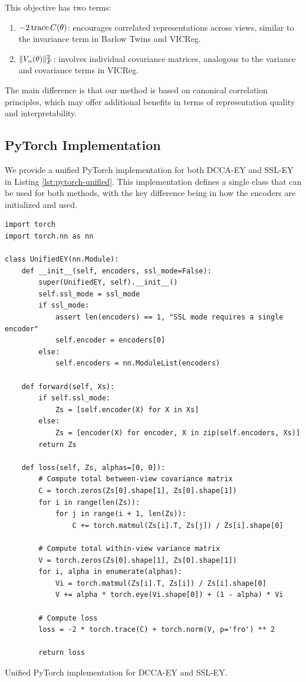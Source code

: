 This objective has two terms:
\begin{enumerate}
    \item $- 2 \operatorname{trace} C(\theta)$: encourages correlated representations across views, similar to the invariance term in Barlow Twins and VICReg.
    \item $\lVert V_\alpha(\theta)\rVert_F^2$: involves individual covariance matrices, analogous to the variance and covariance terms in VICReg.
\end{enumerate}

The main difference is that our method is based on canonical correlation principles, which may offer additional benefits in terms of representation quality and interpretability.

\subsection{PyTorch Implementation}

We provide a unified PyTorch implementation for both DCCA-EY and SSL-EY in Listing \ref{lst:pytorch-unified}. This implementation defines a single class that can be used for both methods, with the key difference being in how the encoders are initialized and used.

\begin{listing}[ht]
    \begin{verbatim}
import torch
import torch.nn as nn

class UnifiedEY(nn.Module):
    def __init__(self, encoders, ssl_mode=False):
        super(UnifiedEY, self).__init__()
        self.ssl_mode = ssl_mode
        if ssl_mode:
            assert len(encoders) == 1, "SSL mode requires a single encoder"
            self.encoder = encoders[0]
        else:
            self.encoders = nn.ModuleList(encoders)

    def forward(self, Xs):
        if self.ssl_mode:
            Zs = [self.encoder(X) for X in Xs]
        else:
            Zs = [encoder(X) for encoder, X in zip(self.encoders, Xs)]
        return Zs

    def loss(self, Zs, alphas=[0, 0]):
        # Compute total between-view covariance matrix
        C = torch.zeros(Zs[0].shape[1], Zs[0].shape[1])
        for i in range(len(Zs)):
            for j in range(i + 1, len(Zs)):
                C += torch.matmul(Zs[i].T, Zs[j]) / Zs[i].shape[0]
        
        # Compute total within-view variance matrix
        V = torch.zeros(Zs[0].shape[1], Zs[0].shape[1])
        for i, alpha in enumerate(alphas):
            Vi = torch.matmul(Zs[i].T, Zs[i]) / Zs[i].shape[0]
            V += alpha * torch.eye(Vi.shape[0]) + (1 - alpha) * Vi
        
        # Compute loss
        loss = -2 * torch.trace(C) + torch.norm(V, p='fro') ** 2
        
        return loss
    \end{verbatim}
    \caption{Unified PyTorch implementation for DCCA-EY and SSL-EY.}
    \label{lst:pytorch-unified}
\end{listing}

